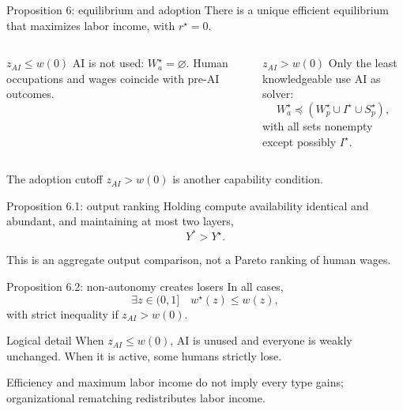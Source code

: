 \documentclass[aspectratio=169,10pt]{beamer}
\newcommand{\wpre}{w}
\newcommand{\wnon}{w^\star}
\begin{document}
\begin{frame}{Proposition 6: equilibrium and adoption}
\small
There is a unique efficient equilibrium that maximizes labor income, with $r^\star=0$.
\vspace{.2cm}
\begin{columns}[T,onlytextwidth]
\begin{alertblock}{$z_{AI}\le w(0)$}
AI is not used: $W_a^\star=\varnothing$. Human occupations and wages coincide with pre-AI outcomes.
\end{alertblock}
\begin{block}{$z_{AI}>w(0)$}
Only the least knowledgeable use AI as solver:
\[
W_a^\star\preceq(W_p^\star\cup I^\star\cup S_p^\star),
\]
with all sets nonempty except possibly $I^\star$.
\end{block}
\end{columns}
\vfill
The adoption cutoff $z_{AI}>w(0)$ is another capability condition.
\end{frame}

\begin{frame}{Proposition 6.1: output ranking}
\small
Holding compute availability identical and abundant, and maintaining at most two layers,
\[
\boxed{Y^{*}>Y^{\star}}.
\]
\begin{center}
\end{center}
This is an aggregate output comparison, not a Pareto ranking of human wages.
\end{frame}

\begin{frame}{Proposition 6.2: non-autonomy creates losers}
\small
In all cases,
\[
\exists z\in(0,1]\quad \wnon(z)\le\wpre(z),
\]
with strict inequality if $z_{AI}>w(0)$.
\begin{alertblock}{Logical detail}
When $z_{AI}\le w(0)$, AI is unused and everyone is weakly unchanged. When it is active, some humans strictly lose.
\end{alertblock}
Efficiency and maximum labor income do not imply every type gains; organizational rematching redistributes labor income.
\end{frame}
\end{document}
